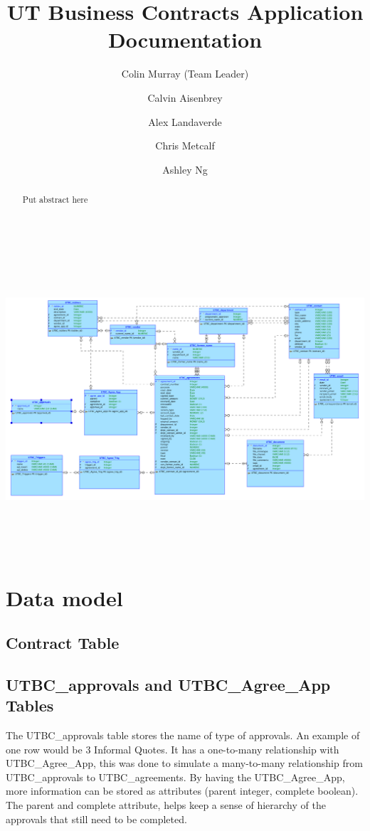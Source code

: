 \documentclass{report}
\begin{document}
\title{\bfseries UT Business Contracts Application Documentation}

\author{
	Colin Murray (Team Leader)
	\and
	Calvin Aisenbrey
	\and
	Alex Landaverde
	\and
	Chris Metcalf
	\and
	Ashley Ng
}

\maketitle

\begin{abstract}
Put abstract here
\end{abstract}

\tableofcontents

\newpage

\begin{image}
\centering
\includegraphics[height = 4.5in, angle = 90]{UTBC_model}
\end{image}



\chapter{Data model}

\section{Contract Table}

\section{UTBC\_approvals and UTBC\_Agree\_App Tables}
The UTBC\_approvals table stores the name of type of approvals. An example of one row would be 3 Informal Quotes. It has a one-to-many relationship with UTBC\_Agree\_App, this was done to simulate a many-to-many relationship from UTBC\_approvals to UTBC\_agreements. By having the UTBC\_Agree\_App, more information can be stored as attributes (parent integer, complete boolean). The parent and complete attribute, helps keep a sense of hierarchy of the approvals that still need to be completed. 
\end{document}
